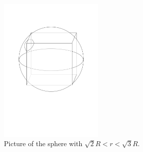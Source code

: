 \documentclass[letterpaper,twocolumn,amsmath,amssymb,pre]{revtex4-1}
\begin{document}
\begin{figure}
\includegraphics[width=2in]{figs/w3cube}
\caption{Picture of the sphere with $\sqrt{2}R<r<\sqrt{3}R$.}\label{fig:rbig}
\end{figure}

\end{document}
